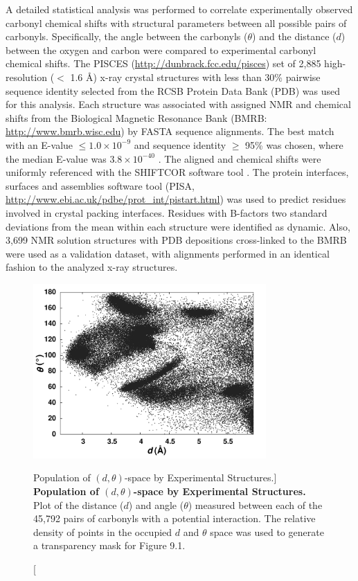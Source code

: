\begin{doublespace}
A detailed statistical analysis was performed to correlate experimentally
observed carbonyl \cnmr{} chemical shifts with structural parameters between
all possible pairs of carbonyls. Specifically, the angle between the carbonyls
($\theta$) and the distance ($d$) between the oxygen and carbon were compared
to experimental carbonyl \cnmr{} chemical shifts. The PISCES
\cite{wang:binf2003} (\url{http://dunbrack.fcc.edu/pisces}) set of
2,885 high-resolution ($<$ 1.6 \r{A}) x-ray crystal structures with less than
30\% pairwise sequence identity selected from the RCSB Protein Data Bank
(PDB) \cite{berman:nar2000} was used for this analysis. Each structure
was associated with assigned NMR \cnmr{} and \nnmr{} chemical shifts from the
Biological Magnetic Resonance Bank (BMRB: \url{http://www.bmrb.wisc.edu})
\cite{ulrich:nar2008} by FASTA \cite{pearson:mmbio2000}
sequence alignments. The best match with an E-value $\leq 1.0\times10^{-9}$
and sequence identity $\geq$ 95\% was chosen, where the median E-value was
$3.8\times10^{-40}$ . The aligned \cnmr{} and \nnmr{} chemical shifts were
uniformly referenced with the SHIFTCOR software tool
\cite{wishart:jbnmr2003}. The protein interfaces,
surfaces and assemblies software tool
(PISA, \url{http://www.ebi.ac.uk/pdbe/prot_int/pistart.html})
\cite{krissinel:acryst2004} was used to predict residues involved
in crystal packing interfaces. Residues with B-factors two standard deviations
from the mean within each structure were identified as dynamic. Also, 3,699 NMR
solution structures with PDB depositions cross-linked to the BMRB were
used as a validation dataset, with alignments performed in an identical
fashion to the analyzed x-ray structures.
\end{doublespace}

\begin{figure}
\includegraphics[width=3.5in]{figs/npistar/02-dtheta.png}
\caption
      [Population of $(d,\theta)$-space by Experimental Structures.]{
  {\bf Population of $(d,\theta)$-space by Experimental Structures.}
  \\
  Plot of the distance ($d$) and angle ($\theta$) measured between each of
  the 45,792 pairs of carbonyls with a potential \npistar{} interaction. The
  relative density of points in the occupied $d$ and $\theta$ space was used
  to generate a transparency mask for Figure 9.1.
}
\end{figure}

